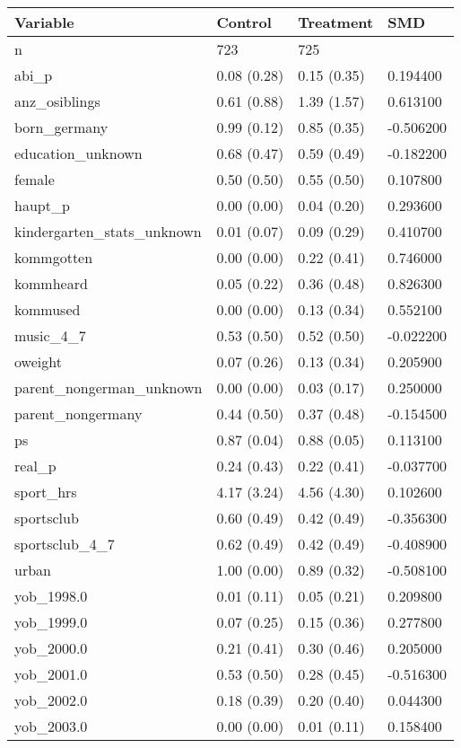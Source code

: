 \begin{tabular}{llll}
\toprule
Variable & Control & Treatment & SMD \\
\midrule
n & 723 & 725 &  \\
abi\_p & 0.08 (0.28) & 0.15 (0.35) & 0.194400 \\
anz\_osiblings & 0.61 (0.88) & 1.39 (1.57) & 0.613100 \\
born\_germany & 0.99 (0.12) & 0.85 (0.35) & -0.506200 \\
education\_unknown & 0.68 (0.47) & 0.59 (0.49) & -0.182200 \\
female & 0.50 (0.50) & 0.55 (0.50) & 0.107800 \\
haupt\_p & 0.00 (0.00) & 0.04 (0.20) & 0.293600 \\
kindergarten\_stats\_unknown & 0.01 (0.07) & 0.09 (0.29) & 0.410700 \\
kommgotten & 0.00 (0.00) & 0.22 (0.41) & 0.746000 \\
kommheard & 0.05 (0.22) & 0.36 (0.48) & 0.826300 \\
kommused & 0.00 (0.00) & 0.13 (0.34) & 0.552100 \\
music\_4\_7 & 0.53 (0.50) & 0.52 (0.50) & -0.022200 \\
oweight & 0.07 (0.26) & 0.13 (0.34) & 0.205900 \\
parent\_nongerman\_unknown & 0.00 (0.00) & 0.03 (0.17) & 0.250000 \\
parent\_nongermany & 0.44 (0.50) & 0.37 (0.48) & -0.154500 \\
ps & 0.87 (0.04) & 0.88 (0.05) & 0.113100 \\
real\_p & 0.24 (0.43) & 0.22 (0.41) & -0.037700 \\
sport\_hrs & 4.17 (3.24) & 4.56 (4.30) & 0.102600 \\
sportsclub & 0.60 (0.49) & 0.42 (0.49) & -0.356300 \\
sportsclub\_4\_7 & 0.62 (0.49) & 0.42 (0.49) & -0.408900 \\
urban & 1.00 (0.00) & 0.89 (0.32) & -0.508100 \\
yob\_1998.0 & 0.01 (0.11) & 0.05 (0.21) & 0.209800 \\
yob\_1999.0 & 0.07 (0.25) & 0.15 (0.36) & 0.277800 \\
yob\_2000.0 & 0.21 (0.41) & 0.30 (0.46) & 0.205000 \\
yob\_2001.0 & 0.53 (0.50) & 0.28 (0.45) & -0.516300 \\
yob\_2002.0 & 0.18 (0.39) & 0.20 (0.40) & 0.044300 \\
yob\_2003.0 & 0.00 (0.00) & 0.01 (0.11) & 0.158400 \\
\bottomrule
\end{tabular}
